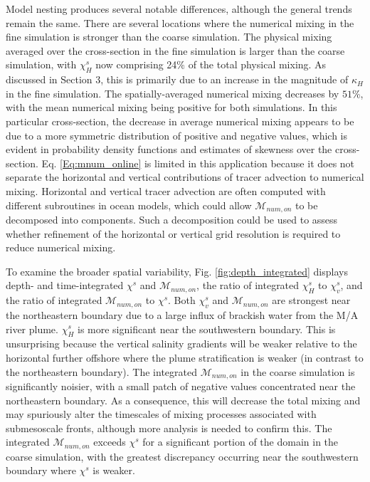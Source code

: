 Model nesting produces several notable differences, although the general trends remain the same. There are several locations where the numerical mixing in the fine simulation is stronger than the coarse simulation. The physical mixing averaged over the cross-section in the fine simulation is larger than the coarse simulation, with $\chi_H^s$ now comprising 24$\%$ of the total physical mixing. As discussed in Section 3, this is primarily due to an increase in the magnitude of $\kappa_H$ in the fine simulation. The spatially-averaged numerical mixing decreases by $51$\%, with the mean numerical mixing being positive for both simulations. In this particular cross-section, the decrease in average numerical mixing appears to be due to a more symmetric distribution of positive and negative values, which is evident in probability density functions and estimates of skewness over the cross-section. Eq. \ref{Eq:mnum_online} is limited in this application because it does not separate the horizontal and vertical contributions of tracer advection to numerical mixing. Horizontal and vertical tracer advection are often computed with different subroutines in ocean models, which could allow $\mathcal{M}_{num, on}$ to be decomposed into components. Such a decomposition could be used to assess whether refinement of the horizontal or vertical grid resolution is required to reduce numerical mixing.

To examine the broader spatial variability, Fig. \ref{fig:depth_integrated} displays depth- and time-integrated $\chi^s$ and $\mathcal{M}_{num, on}$, the ratio of integrated $\chi_H^s$ to $\chi_v^s$, and the ratio of integrated $\mathcal{M}_{num, on}$ to $\chi^s$. Both $\chi_v^s$ and $\mathcal{M}_{num, on}$ are strongest near the northeastern boundary due to a large influx of brackish water from the M/A river plume. $\chi_H^s$ is more significant near the southwestern boundary. This is unsurprising because the vertical salinity gradients will be weaker relative to the horizontal further offshore where the plume stratification is weaker (in contrast to the northeastern boundary). The integrated $\mathcal{M}_{num, on}$ in the coarse simulation is significantly noisier, with a small patch of negative values concentrated near the northeastern boundary. As a consequence, this will decrease the total mixing and may spuriously alter the timescales of mixing processes associated with submesoscale fronts, although more analysis is needed to confirm this. The integrated $\mathcal{M}_{num, on}$ exceeds $\chi^s$ for a significant portion of the domain in the coarse simulation, with the greatest discrepancy occurring near the southwestern boundary where $\chi^s$ is weaker. 

